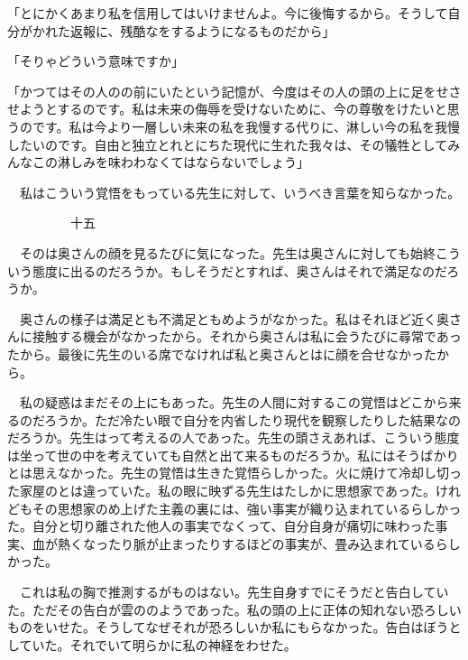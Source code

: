\documentclass[a4j,onecolumn]{tarticle}
\begin{document}
「とにかくあまり私を信用してはいけませんよ。\hbox{}今に後悔するから。\hbox{}そうして自分がかれた返報に、\hbox{}残酷なをするようになるものだから」\par{}
「そりゃどういう意味ですか」\par{}
「かつてはその人のの前にいたという記憶が、\hbox{}今度はその人の頭の上に足をせさせようとするのです。\hbox{}私は未来の侮辱を受けないために、\hbox{}今の尊敬をけたいと思うのです。\hbox{}私は今より一層しい未来の私を我慢する代りに、\hbox{}淋しい今の私を我慢したいのです。\hbox{}自由と独立とれとにちた現代に生れた我々は、\hbox{}その犠牲としてみんなこの淋しみを味わわなくてはならないでしょう」\par{}
　私はこういう覚悟をもっている先生に対して、\hbox{}いうべき言葉を知らなかった。\hbox{}\par{}\par{}　　　　　十五
\par{}
　そのは奥さんの顔を見るたびに気になった。\hbox{}先生は奥さんに対しても始終こういう態度に出るのだろうか。\hbox{}もしそうだとすれば、\hbox{}奥さんはそれで満足なのだろうか。\hbox{}\par{}
　奥さんの様子は満足とも不満足ともめようがなかった。\hbox{}私はそれほど近く奥さんに接触する機会がなかったから。\hbox{}それから奥さんは私に会うたびに尋常であったから。\hbox{}最後に先生のいる席でなければ私と奥さんとはに顔を合せなかったから。\hbox{}\par{}
　私の疑惑はまだその上にもあった。\hbox{}先生の人間に対するこの覚悟はどこから来るのだろうか。\hbox{}ただ冷たい眼で自分を内省したり現代を観察したりした結果なのだろうか。\hbox{}先生はって考えるの人であった。\hbox{}先生の頭さえあれば、\hbox{}こういう態度は坐って世の中を考えていても自然と出て来るものだろうか。\hbox{}私にはそうばかりとは思えなかった。\hbox{}先生の覚悟は生きた覚悟らしかった。\hbox{}火に焼けて冷却し切った家屋のとは違っていた。\hbox{}私の眼に映ずる先生はたしかに思想家であった。\hbox{}けれどもその思想家のめ上げた主義の裏には、\hbox{}強い事実が織り込まれているらしかった。\hbox{}自分と切り離された他人の事実でなくって、\hbox{}自分自身が痛切に味わった事実、\hbox{}血が熱くなったり脈が止まったりするほどの事実が、\hbox{}畳み込まれているらしかった。\hbox{}\par{}
　これは私の胸で推測するがものはない。\hbox{}先生自身すでにそうだと告白していた。\hbox{}ただその告白が雲ののようであった。\hbox{}私の頭の上に正体の知れない恐ろしいものをいせた。\hbox{}そうしてなぜそれが恐ろしいか私にもらなかった。\hbox{}告白はぼうとしていた。\hbox{}それでいて明らかに私の神経をわせた。\hbox{}\par{}
\end{document}
